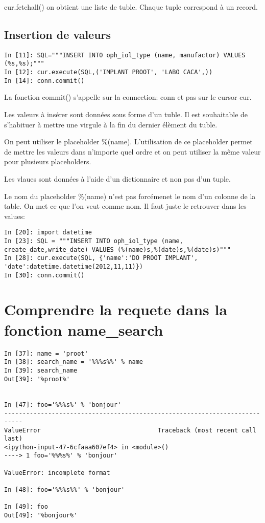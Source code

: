\documentclass[12pt,a4paper]{article}
\begin{document}
cur.fetchall() on obtient une liste de tuble. Chaque tuple correspond à un record. 


\subsection{Insertion de valeurs}
\label{sec:insertion}


\begin{verbatim}
In [11]: SQL="""INSERT INTO oph_iol_type (name, manufactor) VALUES (%s,%s);"""
In [12]: cur.execute(SQL,('IMPLANT PROOT', 'LABO CACA',))
In [14]: conn.commit()
\end{verbatim}

La fonction commit() s'appelle sur la connection: conn et pas sur le cursor cur.

Les valeurs à insérer sont données sous forme d'un tuble. Il est souhaitable de s'habituer à mettre une virgule à la fin du dernier élèment du tuble. 

On peut utiliser le placeholder \%(name). L'utilisation de ce placeholder permet de mettre les valeurs dans n'importe quel ordre et on peut utiliser la même valeur pour plusieurs placeholders. 

Les vlaues sont données à l'aide d'un dictionnaire et non pas d'un tuple.

Le nom  du placeholder \%(name) n'est pas forcémenet le nom d'un colonne de la table. On met ce que l'on veut comme nom. Il faut juste le retrouver dans les values: 


\begin{verbatim}
In [20]: import datetime
In [23]: SQL = """INSERT INTO oph_iol_type (name, create_date,write_date) VALUES (%(name)s,%(date)s,%(date)s)"""
In [28]: cur.execute(SQL, {'name':'DO PROOT IMPLANT', 'date':datetime.datetime(2012,11,11)})
In [30]: conn.commit()
\end{verbatim}


\section{Comprendre la requete dans la fonction name\_search}
\label{sec:namesearch}


\begin{verbatim}
In [37]: name = 'proot'
In [38]: search_name = '%%%s%%' % name                                                    
In [39]: search_name
Out[39]: '%proot%' 


In [47]: foo='%%%s%' % 'bonjour'
---------------------------------------------------------------------------
ValueError                                Traceback (most recent call last)
<ipython-input-47-6cfaaa607ef4> in <module>()
----> 1 foo='%%%s%' % 'bonjour'

ValueError: incomplete format

In [48]: foo='%%%s%%' % 'bonjour'

In [49]: foo
Out[49]: '%bonjour%'
\end{verbatim}
\end{document}
